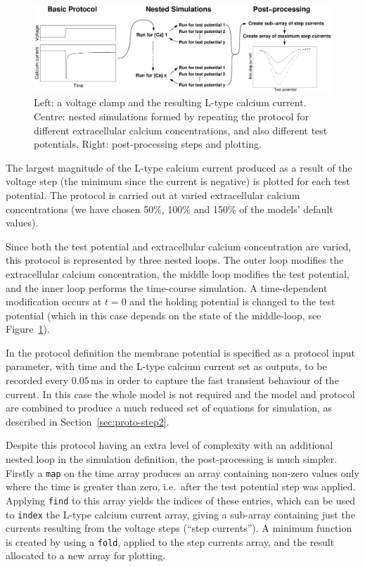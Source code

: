 \documentclass[preprint,authoryear,12pt]{elsarticle}
\newcommand{\secref}[1]{Section~\ref{#1}}
\newcommand{\code}[1]{\texttt{#1}}
\newcommand{\vu}[2]{\ensuremath{#1\,\mathrm{#2}}}
\newcommand{\changed}[1]{#1}
\begin{document}
\begin{figure}
\begin{center}
\includegraphics[width=1.0\linewidth]{ICaLIntro}
\caption{Left: a voltage clamp and the resulting L-type calcium current.
Centre: nested simulations formed by repeating the protocol for different extracellular calcium concentrations, and also different test potentials.
Right: post-processing steps and plotting.}
\label{fig:ICaLIntro}
\end{center}
\end{figure}

\changed{The largest magnitude of the L-type calcium current produced as a result of the voltage step (the minimum since the current is negative) is plotted for each test potential.}
The protocol is carried out at varied extracellular calcium concentrations (we have chosen 50\%, 100\% and 150\% of the models' default values).


Since both the test potential and extracellular calcium concentration are varied, this protocol is represented by three nested loops.
The outer loop modifies the extracellular calcium concentration, the middle loop modifies the test potential, and the inner loop performs the time-course simulation.
A time-dependent modification occurs at $t=0$ and the holding potential is changed to the test potential (which in this case depends on the state of the middle-loop, see Figure~\ref{fig:ICaLIntro}).


In the protocol definition the membrane potential is specified as a protocol input parameter, with time and the L-type calcium current set as outputs, to be recorded every \vu{0.05}{ms} in order to capture the fast transient behaviour of the current.
In this case the whole model is not required and the model and protocol are combined to produce a much reduced set of equations for simulation, as described in \secref{sec:proto-step2}.


Despite this protocol having an extra level of complexity with an additional nested loop in the simulation definition, the post-processing is much simpler.
Firstly a \code{map} on the time array produces an array containing non-zero values only where the time is greater than zero, i.e.\ after the test potential step was applied.
Applying \code{find} to this array yields the indices of these entries, which can be used to \code{index} the L-type calcium current array, giving a sub-array containing just \changed{the currents resulting from the voltage steps (``step currents'')}.
A minimum function is created by using a \code{fold}, applied to the step currents array, and the result allocated to a new array for plotting.
\end{document}
